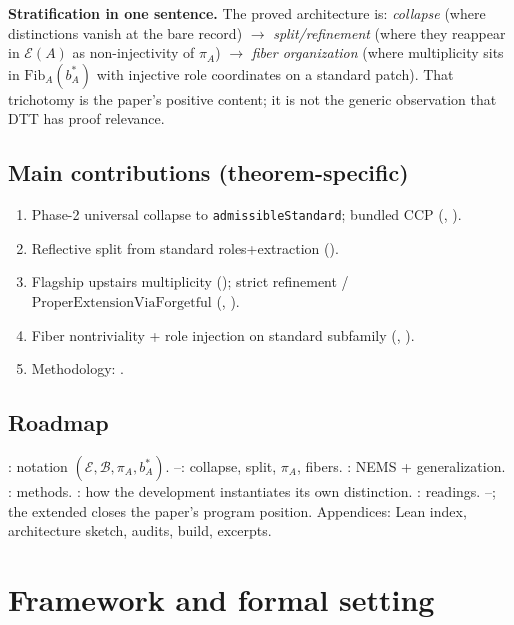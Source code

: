 \documentclass[11pt]{article}
\begin{document}
\smallskip
\noindent\textbf{Stratification in one sentence.} The proved architecture is: \emph{collapse} (where distinctions vanish at the bare record) $\to$ \emph{split/refinement} (where they reappear in $\mathcal{E}(A)$ as non-injectivity of $\pi_A$) $\to$ \emph{fiber organization} (where multiplicity sits in $\mathrm{Fib}_A(b^\ast_A)$ with injective role coordinates on a standard patch). That trichotomy is the paper's positive content; it is not the generic observation that DTT has proof relevance.

\subsection{Main contributions (theorem-specific)}\label{sec:intro-contributions}
\begin{enumerate}
    \item Phase-2 universal collapse to \texttt{admissibleStandard}; bundled CCP (, ).
    \item Reflective split from standard roles+extraction ().
    \item Flagship upstairs multiplicity (); strict refinement / $\mathrm{ProperExtensionViaForgetful}$ (, ).
    \item Fiber nontriviality + role injection on standard subfamily (, ).
    \item Methodology: .
\end{enumerate}

\subsection{Roadmap}\label{sec:intro-roadmap}
: notation $(\mathcal{E},\mathcal{B},\pi_A,b^\ast_A)$. --: collapse, split, $\pi_A$, fibers. : NEMS + generalization. : methods. : how the development instantiates its own distinction. : readings. --; the extended  closes the paper's program position. Appendices: Lean index, architecture sketch, audits, build, excerpts.

\section{Framework and formal setting}\label{sec:framework}
\end{document}
